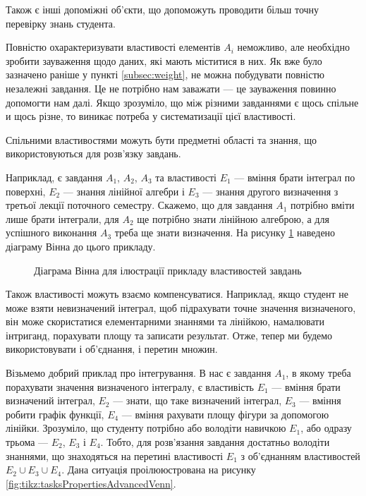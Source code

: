 Також є інші допоміжні об’єкти, що допоможуть проводити більш точну перевірку
знань студента.

Повністю охарактеризувати властивості елементів $A_i$ неможливо, але необхідно
зробити зауваження щодо даних, які мають міститися в них.
Як вже було зазначено раніше у пункті \ref{subsec:weight}, не можна побудувати
повністю незалежні завдання.
Це не потрібно нам заважати --- це зауваження повинно допомогти нам далі.
Якщо зрозуміло, що між різними завданнями є щось спільне и щось різне, то
виникає потреба у систематизації цієї властивості.

Спільними властивостями можуть бути предметні області та знання, що
використовуються для розв’язку завдань.

Наприклад, є завдання $A_1$, $A_2$, $A_3$ та властивості $E_1$ --- вміння брати
інтеграл по поверхні, $E_2$ --- знання лінійної алгебри і $E_3$ --- знання
другого визначення з третьої лекції поточного семестру.
Скажемо, що для завдання $A_1$ потрібно вміти лише брати інтеграли, для $A_2$
ще потрібно знати лінійною алгеброю, а для успішного виконання $A_3$ треба ще
знати визначення.
На рисунку \ref{fig:tikz:tasksPropertiesVenn} наведено діаграму Вінна до цього
прикладу.

\begin{figure}[h]
  \center
  \caption{Діаграма Вінна для ілюстрації прикладу властивостей завдань}
  \label{fig:tikz:tasksPropertiesVenn}
\end{figure}

Також властивості можуть взаємо компенсуватися.
Наприклад, якщо студент не може взяти невизначений інтеграл, щоб підрахувати
точне значення визначеного, він може скористатися елементарними знаннями та
лінійкою, намалювати інтриганд, порахувати площу та записати результат.
Отже, тепер ми будемо використовувати і об’єднання, і перетин множин.

Візьмемо добрий приклад про інтегрування.
В нас є завдання $A_1$, в якому треба порахувати значення визначеного інтегралу,
є властивість $E_1$ --- вміння брати визначений інтеграл,
$E_2$ --- знати, що таке визначений інтеграл, $E_3$ --- вміння робити графік
функції, $E_4$ --- вміння рахувати площу фігури за допомогою лінійки.
Зрозуміло, що студенту потрібно або володіти навичкою $E_1$, або одразу трьома
--- $E_2$, $E_3$ і $E_4$.
Тобто, для розв’язання завдання достатньо володіти знаннями, що знаходяться на
перетині властивості $E_1$ з об’єднанням властивостей $E_2 \cup E_3 \cup E_4$.
Дана ситуація проілююстрована на рисунку
\ref{fig:tikz:tasksPropertiesAdvancedVenn}.

